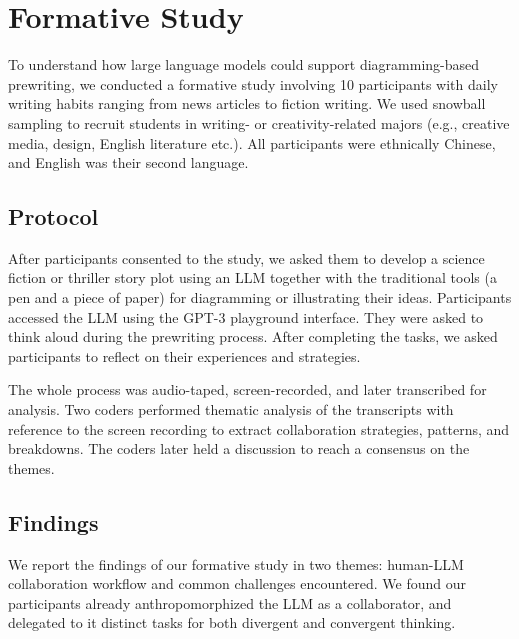 \section{Formative Study}
To understand how large language models could support diagramming-based prewriting, we conducted a formative study involving 10 participants with daily writing habits ranging from news articles to fiction writing. We used snowball sampling to recruit students in writing- or creativity-related majors (e.g., creative media, design, English literature etc.). All participants were ethnically Chinese, and English was their second language.

\subsection{Protocol}
After participants consented to the study, we asked them to develop a science fiction or thriller story plot using an LLM together with the traditional tools (a pen and a piece of paper) for diagramming or illustrating their ideas.
Participants accessed the LLM using the GPT-3 playground interface.
They were asked to think aloud during the prewriting process.
After completing the tasks, we asked participants to reflect on their experiences and strategies.

The whole process was audio-taped, screen-recorded, and later transcribed for analysis. Two coders performed thematic analysis \cite{corbin2014basics} of the transcripts with reference to the screen recording to extract collaboration strategies, patterns, and breakdowns. The coders later held a discussion to reach a consensus on the themes.

\subsection{Findings}
We report the findings of our formative study in two themes: human-LLM collaboration workflow and common challenges encountered. We found our participants already anthropomorphized the LLM as a collaborator, and delegated to it distinct tasks for both divergent and convergent thinking.

